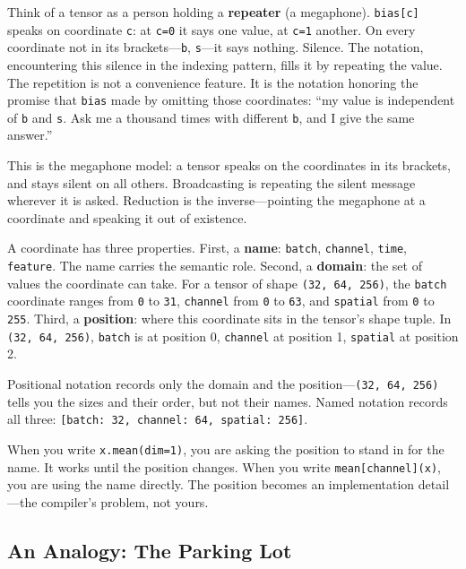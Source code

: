 \documentclass[11pt,titlepage]{article}
\begin{document}
Think of a tensor as a person holding a \textbf{repeater} (a megaphone).
\texttt{bias{[}c{]}} speaks on coordinate \texttt{c}: at \texttt{c=0} it
says one value, at \texttt{c=1} another. On every coordinate not in its
brackets---\texttt{b}, \texttt{s}---it says nothing. Silence. The
notation, encountering this silence in the indexing pattern, fills it by
repeating the value. The repetition is not a convenience feature. It is
the notation honoring the promise that \texttt{bias} made by omitting
those coordinates: ``my value is independent of \texttt{b} and
\texttt{s}. Ask me a thousand times with different \texttt{b}, and I
give the same answer.''

This is the megaphone model: a tensor speaks on the coordinates in its
brackets, and stays silent on all others. Broadcasting is repeating the
silent message wherever it is asked. Reduction is the inverse---pointing
the megaphone at a coordinate and speaking it out of existence.

A coordinate has three properties. First, a \textbf{name}:
\texttt{batch}, \texttt{channel}, \texttt{time}, \texttt{feature}. The
name carries the semantic role. Second, a \textbf{domain}: the set of
values the coordinate can take. For a tensor of shape
\texttt{(32,\ 64,\ 256)}, the \texttt{batch} coordinate ranges from
\texttt{0} to \texttt{31}, \texttt{channel} from \texttt{0} to
\texttt{63}, and \texttt{spatial} from \texttt{0} to \texttt{255}.
Third, a \textbf{position}: where this coordinate sits in the tensor's
shape tuple. In \texttt{(32,\ 64,\ 256)}, \texttt{batch} is at position
0, \texttt{channel} at position 1, \texttt{spatial} at position 2.

Positional notation records only the domain and the
position---\texttt{(32,\ 64,\ 256)} tells you the sizes and their order,
but not their names. Named notation records all three:
\texttt{{[}batch:\ 32,\ channel:\ 64,\ spatial:\ 256{]}}.

When you write \texttt{x.mean(dim=1)}, you are asking the position to
stand in for the name. It works until the position changes. When you
write \texttt{mean{[}channel{]}(x)}, you are using the name directly.
The position becomes an implementation detail---the compiler's problem,
not yours.

\vspace{2em}

\hypertarget{an-analogy-the-parking-lot}{%
\subsection{An Analogy: The Parking
Lot}\label{an-analogy-the-parking-lot}}
\end{document}

